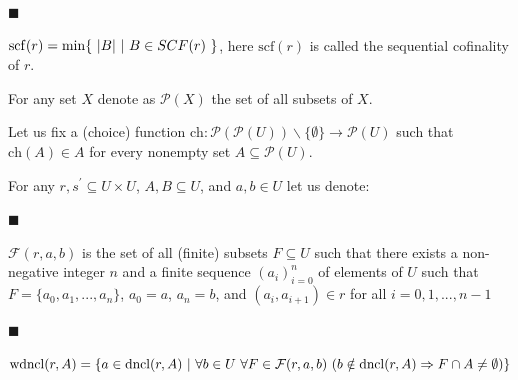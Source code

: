  
 
\par\noindent  $\blacksquare$ 
 
$\mathrm{scf}(r)=\min\{\leavevmode\nobreak\ |B|\leavevmode\nobreak\ |%
\leavevmode\nobreak\ B\in SCF(r)\leavevmode\nobreak\ \}$, here $\mathrm{scf}(r)$ is called the sequential cofinality of $r$.\par
 
 
  
 
 
For any set $X$ denote as $\mathcal{P}(X)$ the set of all subsets of $X$.\par
 
 
 
Let us fix a (choice) function $\mathrm{ch}:\mathcal{P}(\mathcal{P}(U))\backslash\{\emptyset\}\to\mathcal{P}(U)$ such that $\mathrm{ch}(A)\in A$ for every nonempty set $A\subseteq\mathcal{P}(U)$.\par
 
 
 
For any $r,s^{\prime}\subseteq U\times U$, $A,B\subseteq U$, and $a,b\in U$ let us denote:\par
  
\par\noindent  $\blacksquare$ 
 
$\mathcal{F}(r,a,b)$ is the set of all (finite) subsets $F\subseteq U$ such that there exists a non-negative integer $n$ and a finite sequence $(a_{i})_{i=0}^{n}$ of elements of $U$ such that $F=\{a_{0},a_{1},...,a_{n}\}$, $a_{0}=a$, $a_{n}=b$, and $(a_{i},a_{i+1})\in r$ for all $i=0,1,...,n-1$\par
 
 
 
\par\noindent  $\blacksquare$ 
 
$\mathrm{wdncl}(r,A)=\{a\in\mathrm{dncl}(r,A)\leavevmode\nobreak\ |\leavevmode%
\nobreak\ \forall b\in U\leavevmode\nobreak\ \forall F\in\mathcal{F}(r,a,b)%
\leavevmode\nobreak\ (b\notin\mathrm{dncl}(r,A)\Rightarrow F\cap A\neq%
\emptyset)\}$\par
 
 
